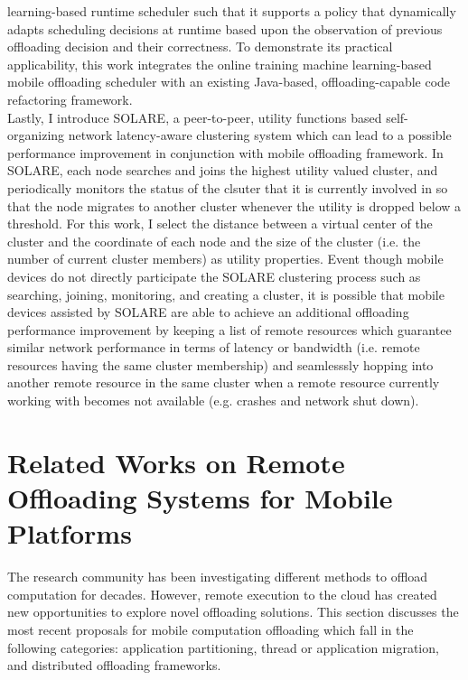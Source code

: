 learning-based runtime scheduler such that it supports a policy that
dynamically adapts scheduling decisions at runtime based upon the
observation of previous offloading decision and their correctness.
%
To demonstrate its practical applicability, this work integrates the
online training machine learning-based mobile offloading scheduler with
an existing Java-based, offloading-capable code refactoring framework.\\ 
%
Lastly, I introduce SOLARE, a peer-to-peer, utility functions based
self-organizing network latency-aware clustering system which can lead
to a possible performance improvement in conjunction with mobile
offloading framework.
%
In SOLARE, each node searches and joins the highest utility valued
cluster, and periodically monitors the status of the clsuter that it is
currently involved in so that the node migrates to another cluster
whenever the utility is dropped below a threshold.
%
For this work, I select the distance between a virtual center of the
cluster and the coordinate of each node and the size of the cluster
(i.e. the number of current cluster members) as utility properties.
%
Event though mobile devices do not directly participate the SOLARE
clustering process such as searching, joining, monitoring, and creating
a cluster, it is possible that mobile devices assisted by SOLARE
are able to achieve an additional offloading performance improvement by
keeping a list of remote resources which guarantee similar network
performance in terms of latency or bandwidth (i.e. remote resources
having the same cluster membership) and seamlesssly hopping into another
remote resource in the same cluster when a remote resource currently
working with becomes not available (e.g. crashes and network shut down).

\section{Related Works on Remote Offloading Systems for Mobile Platforms}
\label{intro:relatedwork}

The research community has been investigating different methods to
offload computation for decades.
%
However, remote execution to the cloud has created new opportunities to
explore novel offloading solutions.
%
This section discusses the most recent proposals for mobile computation
offloading which fall in the following categories: application
partitioning, thread or application migration, and distributed
offloading frameworks.
%
